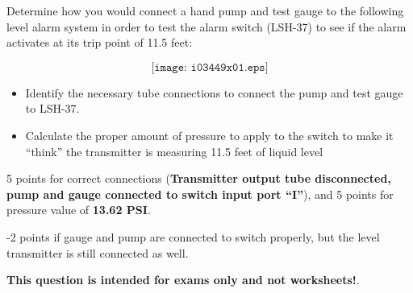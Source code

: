 

Determine how you would connect a hand pump and test gauge to the following level alarm system in order to test the alarm switch (LSH-37) to see if the alarm activates at its trip point of 11.5 feet:

$$\texttt{[image: i03449x01.eps]}$$

\begin{itemize}
\item{} Identify the necessary tube connections to connect the pump and test gauge to LSH-37.
\item{} Calculate the proper amount of pressure to apply to the switch to make it ``think'' the transmitter is measuring 11.5 feet of liquid level
\end{itemize}







5 points for correct connections ({\bf Transmitter output tube disconnected, pump and gauge connected to switch input port ``I''}), and 5 points for pressure value of {\bf 13.62 PSI}.

\vskip 10pt

-2 points if gauge and pump are connected to switch properly, but the level transmitter is still connected as well.







{\bf This question is intended for exams only and not worksheets!}.



